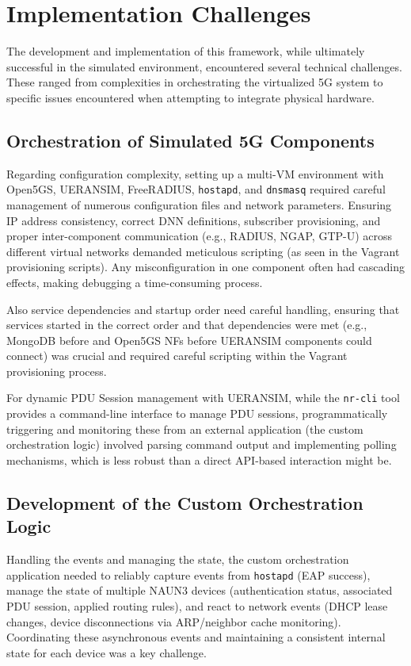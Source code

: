 \section{Implementation Challenges}

The development and implementation of this framework, while ultimately successful in the simulated environment, encountered several technical challenges. These ranged from complexities in orchestrating the virtualized \ac{5G} system to specific issues encountered when attempting to integrate physical hardware.

\subsection{Orchestration of Simulated \ac{5G} Components}

Regarding configuration complexity, setting up a multi-\ac{VM} environment with Open5GS, UERANSIM, FreeRADIUS, \texttt{hostapd}, and \texttt{dnsmasq} required careful management of numerous configuration files and network parameters. Ensuring \ac{IP} address consistency, correct \ac{DNN} definitions, subscriber provisioning, and proper inter-component communication (e.g., \ac{RADIUS}, \ac{NGAP}, \ac{GTP-U}) across different virtual networks demanded meticulous scripting (as seen in the Vagrant provisioning scripts). Any misconfiguration in one component often had cascading effects, making debugging a time-consuming process.

Also service dependencies and startup order need careful handling, ensuring that services started in the correct order and that dependencies were met (e.g., MongoDB before and Open5GS \acp{NF} before UERANSIM components could connect) was crucial and required careful scripting within the Vagrant provisioning process.

For dynamic \ac{PDU} Session management with UERANSIM, while the \texttt{nr-cli} tool provides a command-line interface to manage \ac{PDU} sessions, programmatically triggering and monitoring these from an external application (the custom orchestration logic) involved parsing command output and implementing polling mechanisms, which is less robust than a direct \ac{API}-based interaction might be.

\subsection{Development of the Custom Orchestration Logic}

Handling the events and managing the state, the custom orchestration application needed to reliably capture events from \texttt{hostapd} (\ac{EAP} success), manage the state of multiple \ac{NAUN3} devices (authentication status, associated \ac{PDU} session, applied routing rules), and react to network events (\ac{DHCP} lease changes, device disconnections via \ac{ARP}/neighbor cache monitoring). Coordinating these asynchronous events and maintaining a consistent internal state for each device was a key challenge.

